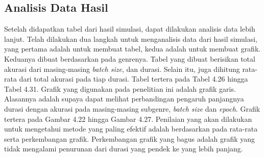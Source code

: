 \subsection{Analisis Data Hasil}
\label{subsec:grafikanalisis}

Setelah didapatkan tabel dari hasil simulasi, dapat dilakukan analisis data lebih lanjut. Telah dilakukan dua langkah untuk menganalisis data dari hasil simulasi, yang pertama adalah untuk membuat tabel, kedua adalah untuk membuat grafik. Keduanya dibuat berdasarkan pada genrenya. Tabel yang dibuat berisikan total akurasi dari masing-masing \emph{batch size}, dan durasi. Selain itu, juga dihitung rata-rata dari total akurasi pada tiap durasi. Tabel tertera pada Tabel 4.26 hingga Tabel 4.31. Grafik yang digunakan pada penelitian ini adalah grafik garis. Alasannya adalah supaya dapat melihat perbandingan pengaruh panjangnya durasi dengan akurasi pada masing-masing subgenre, \emph{batch size} dan \emph{epoch}. Grafik tertera pada Gambar 4.22 hingga Gambar 4.27. Penilaian yang akan dilakukan untuk mengetahui metode yang paling efektif adalah berdasarkan pada rata-rata serta perkembangan grafik. Perkembangan grafik yang bagus adalah grafik yang tidak mengalami penurunan dari durasi yang pendek ke yang lebih panjang.

